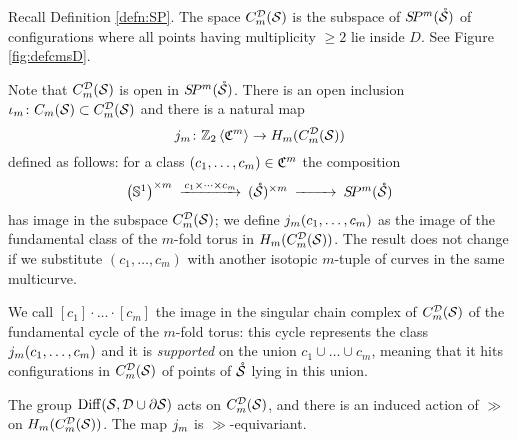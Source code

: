 % 
\begin{defn}
 \label{defn:cmsD}
 Recall Definition \ref{defn:SP}.
 The space $C_{m}^{\mathcal{D}}(\mathcal{S})$ is the subspace of $S\!P^m(\mathring{\mathcal{S}})$ of configurations where all points
 having multiplicity $\geq 2$ lie inside $D$.
 See Figure \ref{fig:defcmsD}.
 
  Note that $C_{m}^{\mathcal{D}}(\mathcal{S})$ is open in $S\!P^m(\mathring{\mathcal{S}})$. There is an open inclusion $\iota_m\colon C_m(\mathcal{S})\subset C_{m}^{\mathcal{D}}(\mathcal{S})$ and there is a natural map
  \[
  j_m\colon \mathbb{Z}_2\left<\mathfrak{C}^{m}\right>\to H_m(C_{m}^{\mathcal{D}}(\mathcal{S}))
  \]
  defined as follows: for a class $(c_1,\dots,c_m)\in\mathfrak{C}^m$
  the composition
  \[
   \begin{CD}
    \pa{\Sone}^{\times m} @>c_1\times\dots\times c_m >> (\mrS)^{\times m} @>>> \SP^m(\mrS)
   \end{CD}
  \]
has image in the subspace $C_{m}^{\mathcal{D}}(\mathcal{S})$; we define $j_m(c_1,\dots,c_m)$ as the image
of the fundamental class
of the $m$-fold torus in $H_m(C_{m}^{\mathcal{D}}(\mathcal{S}))$. The result does not change
if we substitute $(c_1,\dots,c_m)$ with another isotopic $m$-tuple of curves in the same multicurve.

We call $[c_1]\cdot\ldots\cdot[c_m]$ the image in the singular chain complex of $C_{m}^{\mathcal{D}}(\mathcal{S})$ of
the fundamental cycle of the
$m$-fold torus: this cycle represents the class $j_m(c_1,\dots,c_m)$ and it is \emph{supported}
on the union $c_1\cup\dots\cup c_m$, meaning that it hits configurations in $C_{m}^{\mathcal{D}}(\mathcal{S})$ of points of $\mathring{\mathcal{S}}$
lying in this union.

The group $\operatorname{Diff}(\mathcal{S},\mathcal{D}\cup\partial\mathcal{S})$ acts on $C_{m}^{\mathcal{D}}(\mathcal{S})$, and there is an induced action of $\gg$
on $H_m(C_{m}^{\mathcal{D}}(\mathcal{S}))$. The map $j_m$ is $\gg$-equivariant.
\end{defn}

